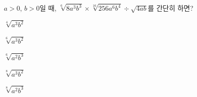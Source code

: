 $a>0$, $b>0$일 때, $\sqrt[6]{8a^3b^3}\times\sqrt[16]{256a^6b^4}\div\sqrt{4ab}$를 간단히 하면?
\begin{choices32}{\rule[-3ex]{0pt}{8ex}$\sqrt[4]{a^3b^2}$}{\rule[-3ex]{0pt}{8ex}$\sqrt[6]{a^3b^2}$}{\rule[-3ex]{0pt}{8ex}$\sqrt[6]{a^2b^3}$}{\rule[-3ex]{0pt}{8ex}$\sqrt[8]{a^3b^2}$}{\rule[-3ex]{0pt}{8ex}$\sqrt[8]{a^2b^3}$}\end{choices32}
